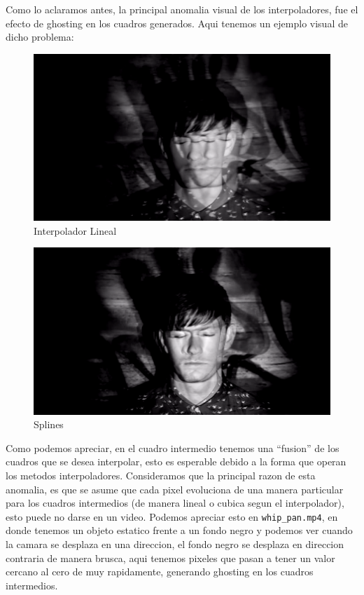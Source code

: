 Como lo aclaramos antes, la principal anomalia visual de los interpoladores, fue el efecto de ghosting en los cuadros generados. Aqui tenemos un ejemplo visual de dicho problema:

\begin{figure}[h]
\centering
  \begin{minipage}[b]{.9\textwidth}
    \includegraphics[width=\textwidth]{imagenes/whipLineal.png}
    \caption{Interpolador Lineal}
  \end{minipage}
\end{figure}

\newpage

\begin{figure}[h]
\centering
  \begin{minipage}[b]{.9\textwidth}
    \includegraphics[width=\textwidth]{imagenes/whipSplines.png}
    \caption{Splines}
  \end{minipage}
\end{figure}

Como podemos apreciar, en el cuadro intermedio tenemos una "`fusion"' de los cuadros que se desea interpolar, esto es esperable debido a la forma que operan los metodos interpoladores. Consideramos que la principal razon de esta anomalia, es que se asume que cada pixel evoluciona de una manera particular para los cuadros intermedios (de manera lineal o cubica segun el interpolador), esto puede no darse en un video. Podemos apreciar esto en \texttt{whip\_pan.mp4}, en donde tenemos un objeto estatico frente a un fondo negro y podemos ver cuando la camara se desplaza en una direccion, el fondo negro se desplaza en direccion contraria de manera brusca, aqui tenemos pixeles que pasan a tener un valor cercano al cero de muy rapidamente, generando ghosting en los cuadros intermedios.

